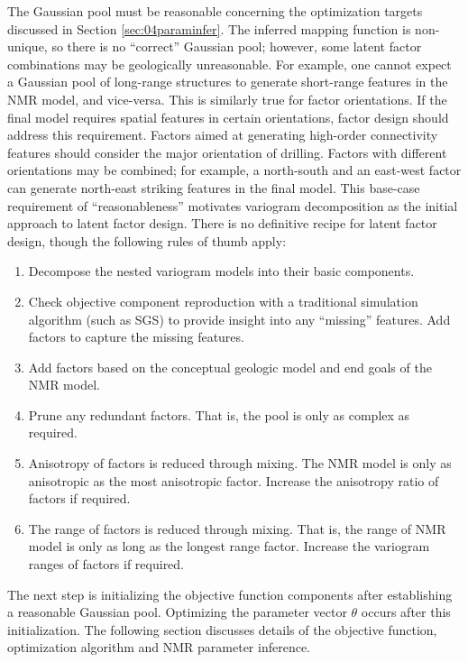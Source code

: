 The Gaussian pool must be reasonable concerning the optimization targets discussed in Section \ref{sec:04paraminfer}. The inferred mapping function is non-unique, so there is no ``correct'' Gaussian pool; however, some latent factor combinations may be geologically unreasonable. For example, one cannot expect a Gaussian pool of long-range structures to generate short-range features in the \gls{NMR} model, and vice-versa. This is similarly true for factor orientations. If the final model requires spatial features in certain orientations, factor design should address this requirement. Factors aimed at generating high-order connectivity features should consider the major orientation of drilling. Factors with different orientations may be combined; for example, a north-south and an east-west factor can generate north-east striking features in the final model. This base-case requirement of ``reasonableness'' motivates variogram decomposition as the initial approach to latent factor design. There is no definitive recipe for latent factor design, though the following rules of thumb apply:
\begin{enumerate}[noitemsep]
    \item Decompose the nested variogram models into their basic components.
    \item Check objective component reproduction with a traditional simulation algorithm (such as \gls{SGS}) to provide insight into any ``missing'' features. Add factors to capture the missing features.
    \item Add factors based on the conceptual geologic model and end goals of the \gls{NMR} model.
    \item Prune any redundant factors. That is, the pool is only as complex as required.
    \item Anisotropy of factors is reduced through mixing. The \gls{NMR} model is only as anisotropic as the most anisotropic factor. Increase the anisotropy ratio of factors if required.
    \item The range of factors is reduced through mixing. That is, the range of \gls{NMR} model is only as long as the longest range factor. Increase the variogram ranges of factors if required.
\end{enumerate}

The next step is initializing the objective function components after establishing a reasonable Gaussian pool. Optimizing the parameter vector $\theta$ occurs after this initialization. The following section discusses details of the objective function, optimization algorithm and \gls{NMR} parameter inference.


